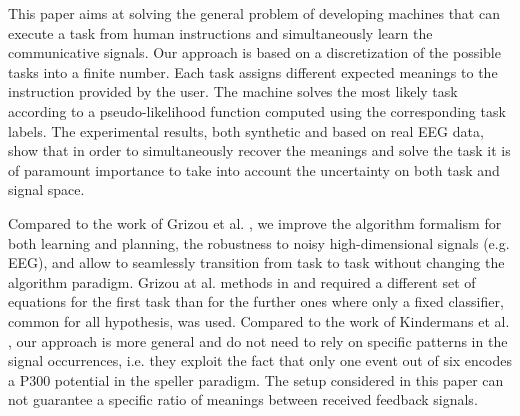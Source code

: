 
This paper aims at solving the general problem of developing machines that can execute a task from human instructions and simultaneously learn the communicative signals.
%
Our approach is based on a discretization of the possible tasks into a finite number. Each task assigns different expected meanings to the instruction provided by the user. The machine solves the most likely task according to a pseudo-likelihood function computed using the corresponding task labels. The experimental results, both synthetic and based on real EEG data, show that in order to simultaneously recover the meanings and solve the task it is of paramount importance to take into account the uncertainty on both task and signal space.

Compared to the work of Grizou et al. \cite{grizou2013robot,grizou2014calibration}, we improve the algorithm formalism for both learning and planning, the robustness to noisy high-dimensional signals (e.g. EEG), and allow to seamlessly transition from task to task without changing the algorithm paradigm. Grizou at al. methods in \cite{grizou2013robot} and \cite{grizou2014calibration} required a different set of equations for the first task than for the further ones where only a fixed classifier, common for all hypothesis, was used. Compared to the work of Kindermans et al. \cite{Kindermans2012a,kindermans2014integrating}, our approach is more general and do not need to rely on specific patterns in the signal occurrences, i.e. they exploit the fact that only one event out of six encodes a P300 potential in the speller paradigm. The setup considered in this paper can not guarantee a specific ratio of meanings between received feedback signals.

